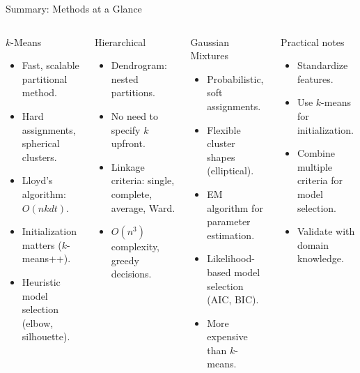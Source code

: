 \begin{frame}{Summary: Methods at a Glance}
  \begin{columns}[t]
      \begin{block}{$k$-Means}
        \begin{itemize}
          \item Fast, scalable partitional method.
          \item Hard assignments, spherical clusters.
          \item Lloyd's algorithm: $O(nkdt)$.
          \item Initialization matters ($k$-means++).
          \item Heuristic model selection (elbow, silhouette).
        \end{itemize}
      \end{block}
      \vspace{0.4em}
      \begin{block}{Hierarchical}
        \begin{itemize}
          \item Dendrogram: nested partitions.
          \item No need to specify $k$ upfront.
          \item Linkage criteria: single, complete, average, Ward.
          \item $O(n^3)$ complexity, greedy decisions.
        \end{itemize}
      \end{block}
      \begin{block}{Gaussian Mixtures}
        \begin{itemize}
          \item Probabilistic, soft assignments.
          \item Flexible cluster shapes (elliptical).
          \item EM algorithm for parameter estimation.
          \item Likelihood-based model selection (AIC, BIC).
          \item More expensive than $k$-means.
        \end{itemize}
      \end{block}
      \vspace{0.4em}
      \begin{block}{Practical notes}
        \begin{itemize}
          \item Standardize features.
          \item Use $k$-means for initialization.
          \item Combine multiple criteria for model selection.
          \item Validate with domain knowledge.
        \end{itemize}
      \end{block}
  \end{columns}
\end{frame}

